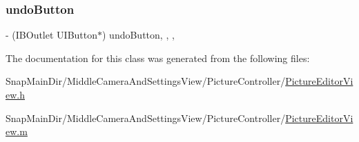 \hypertarget{interface_picture_editor_view_ad93327ee9b31ebf01e5514a3fd1a9cb1}{}\label{interface_picture_editor_view_ad93327ee9b31ebf01e5514a3fd1a9cb1} 
\subsubsection{\texorpdfstring{undo\+Button}{undoButton}}
{\footnotesize\ttfamily -\/ (I\+B\+Outlet U\+I\+Button$\ast$) undo\+Button\hspace{0.3cm}{\ttfamily [read]}, {\ttfamily [write]}, {\ttfamily [nonatomic]}, {\ttfamily [weak]}}



The documentation for this class was generated from the following files\+:\begin{DoxyCompactItemize}
\item 
Snap\+Main\+Dir/\+Middle\+Camera\+And\+Settings\+View/\+Picture\+Controller/\hyperlink{_picture_editor_view_8h}{Picture\+Editor\+View.\+h}\item 
Snap\+Main\+Dir/\+Middle\+Camera\+And\+Settings\+View/\+Picture\+Controller/\hyperlink{_picture_editor_view_8m}{Picture\+Editor\+View.\+m}\end{DoxyCompactItemize}
